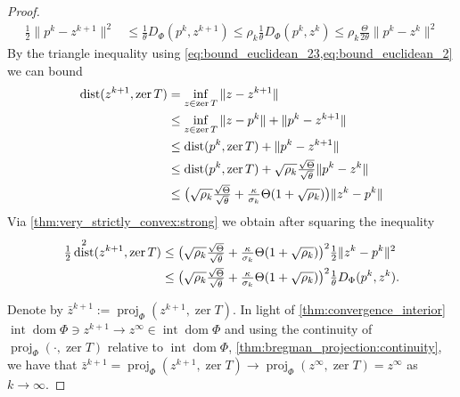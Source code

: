 \documentclass[11pt,onecolumn]{article}
\DeclareMathOperator{\dom}{dom}
\DeclareMathOperator{\intr}{int}
\DeclareMathOperator{\proj}{proj}
\DeclareMathOperator{\zer}{zer}
\DeclareMathOperator{\dist}{dist}
\theoremstyle{remark}
\begin{document}
\begin{proof}
\begin{align}
        \tfrac{1}{2}\|p^k-z^{k+1}\|^2 &\leq\tfrac{1}{\theta} D_\Phi(p^k, z^{k+1}) \leq \rho_k \tfrac{1}{\theta}D_\Phi(p^k, z^{k}) \leq \rho_k \tfrac{\Theta}{2\theta}\|p^k-z^{k}\|^2
    \end{align}
    By the triangle inequality using \cref{eq:bound_euclidean_23,eq:bound_euclidean_2} we can bound
    \begin{align}
    \dist(z^{k+1}, \zer T) &= \inf_{z \in \zer T} \|z -z^{k+1}\| \notag\\
    &\leq \inf_{z \in \zer T} \|z -p^k\| +\|p^k-z^{k+1}\| \notag\\
    &\leq \dist(p^{k}, \zer T) +\|p^k-z^{k+1}\| \notag\\
    &\leq \dist(p^{k}, \zer T) + \sqrt{\rho_k} \tfrac{\sqrt{\Theta}}{\sqrt{\theta}}\|p^k-z^{k}\| \notag \\
    &\leq \big(\sqrt{\rho_k} \tfrac{\sqrt{\Theta}}{\sqrt{\theta}}+\tfrac{\kappa}{\sigma_k}\Theta(1+\sqrt{\rho_k})\big)\|z^k - p^k\|
    \end{align}
    Via \cref{thm:very_strictly_convex:strong} we obtain after squaring the inequality
    \begin{align} \label{eq:bound_euclidean_bregman_1}
    \tfrac{1}{2}\dist^2(z^{k+1}, \zer T) &\leq \big(\sqrt{\rho_k} \tfrac{\sqrt{\Theta}}{\sqrt{\theta}}+\tfrac{\kappa}{\sigma_k}\Theta(1+\sqrt{\rho_k})\big)^2  \tfrac{1}{2}\|z^k - p^k\|^2 \notag\\
    &\leq \big(\sqrt{\rho_k} \tfrac{\sqrt{\Theta}}{\sqrt{\theta}}+\tfrac{\kappa}{\sigma_k}\Theta(1+\sqrt{\rho_k})\big)^2 \tfrac{1}{\theta}D_\Phi(p^k, z^k).
    \end{align}

    Denote by $\bar z^{k+1} := \proj_\Phi(z^{k+1}, \zer T)$.
    In light of \cref{thm:convergence_interior} $\intr \dom \Phi \ni z^{k+1} \to z^\infty \in \intr \dom \Phi$ and using the continuity of $\proj_\Phi(\cdot, \zer T)$ relative to $\intr \dom \Phi$, \cref{thm:bregman_projection:continuity}, we have that $\bar z^{k+1} = \proj_\Phi(z^{k+1}, \zer T) \to \proj_\Phi(z^\infty, \zer T)=z^\infty$ as $k\to \infty$.
    

\end{proof}
\end{document}
